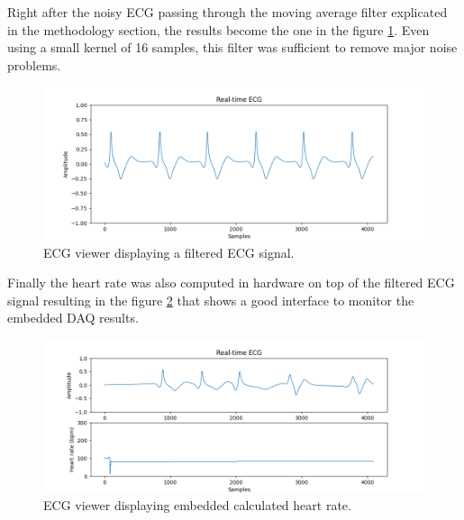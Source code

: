Right after the noisy ECG passing through the moving average filter explicated in the methodology section, the results become the one in the figure \ref{fig:DAQ:2}. Even using a small kernel of 16 samples, this filter was sufficient to remove major noise problems.

\begin{figure}[h!] 
    \centering
    \includegraphics[width=\textwidth]{images/DAQ/daq_ecg_filtered.png}
    \caption{ECG viewer displaying a filtered ECG signal.}
    \label{fig:DAQ:2}
\end{figure}
\pagebreak

Finally the heart rate was also computed in hardware on top of the filtered ECG signal resulting in the figure \ref{fig:DAQ:3} that shows a good interface to monitor the embedded DAQ results.

\begin{figure}[h!] 
    \centering
    \includegraphics[width=\textwidth]{images/DAQ/daq_heart_rate.png}
    \caption{ECG viewer displaying embedded calculated heart rate.}
    \label{fig:DAQ:3}
\end{figure}
\pagebreak